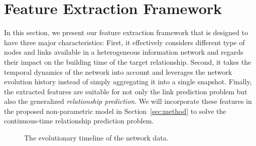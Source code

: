 \section{Feature Extraction Framework}\label{sec:features}

In this section, we present our feature extraction framework that is designed to have three major characteristics: First, it effectively considers different type of nodes and links available in a heterogeneous information network and regards their impact on the building time of the target relationship. Second, it takes the temporal dynamics of the network into account and leverages the network evolution history instead of simply aggregating it into a single snapshot. Finally, the extracted features are suitable for not only the link prediction problem but also the generalized \emph{relationship prediction}. We will incorporate these features in the proposed non-parametric model in Section~\ref{sec:method} to solve the continuous-time relationship prediction problem.

\begin{figure}
    \begin{chronology}[align=left, startyear=0,stopyear=200, width=\columnwidth, height=1pt, startdate=false, stopdate=false, arrowwidth=4pt, arrowheight=3pt]
        \footnotesize
    \end{chronology}
    \caption{The evolutionary timeline of the network data.}
    \label{fig:timeline}
\end{figure}

